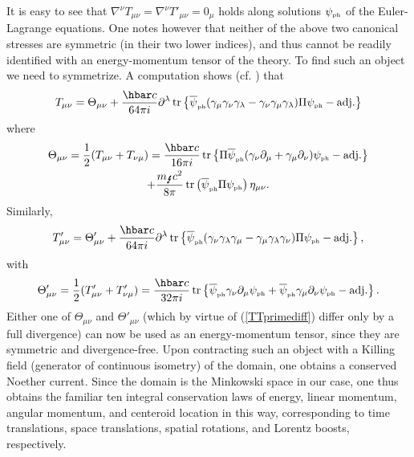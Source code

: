 \documentclass[12pt]{article}
\theoremstyle{definition}
\DeclareMathOperator{\tr}{tr}
\newcommand{\refeq}[1]{(\ref{#1})}
\numberwithin{equation}{section}
\newcommand{\beq}{\begin{equation}}
\newcommand{\eeq}{\end{equation}}
\newcommand{\p}{\partial}
\newcommand{\psiPH}{{\psi_{\mbox{\rm\tiny ph}}}}
\newcommand{\psiPHb}{{\overline\psi_{\mbox{\rm\tiny ph}}}}
\newcommand{\mPH}{{m_{\mbox{\Lightning}}}}
\newcommand{\la}{\lambda}
\newcommand{\ga}{\gamma}
\newcommand{\nab}{\nabla}
\newcommand{\half}{\frac{1}{2}}
\begin{document}
It is easy to see that $\nab^\nu T_{\mu\nu} = \nab^\nu T'_{\mu\nu} = 0_\mu$ holds along solutions $\psiPH$ of the Euler-Lagrange equations.
  One notes however that neither of the above two canonical stresses are symmetric (in their two lower indices), and thus cannot be readily 
identified with an energy-momentum tensor of the theory. 
 To find such an object we need to symmetrize. 
 A computation shows (cf. \cite{HC1946}) that
\begin{multline} 
T_{\mu\nu} = 
\Theta_{\mu\nu}+\frac{\hbar c}{64 \pi i} \p^\la \tr \left\{ \psiPHb (\ga_\mu\ga_\nu\ga_\la - \ga_\nu\ga_\mu\ga_\la) \Pi\psiPH - \mbox{adj.} \right\}
\end{multline} 
where
\begin{multline} 
\Theta_{\mu\nu} = \half (T_{\mu\nu} + T_{\nu\mu}) =
\frac{\hbar c}{16 \pi i} \tr\left\{ \Pi\psiPHb (\ga_\nu \p_\mu + \ga_\mu\p_\nu)\psiPH - \mbox{adj.} \right\} \\
+\frac{\mPH c^2}{8 \pi} \tr \left(\psiPHb \Pi\psiPH\right)\eta_{\mu\nu}.
\end{multline} 
Similarly,
\beq 
T'_{\mu\nu} = 
\Theta'_{\mu\nu}+\frac{\hbar c}{64 \pi i} \p^\la \tr\left\{ \psiPHb (\ga_\nu\ga_\la \ga_\mu - \ga_\mu \ga_\la \ga_\nu ) 
\Pi \psiPH - \mbox{adj.} \right\},
\eeq
with 
\beq 
\Theta'_{\mu\nu} = \half( T'_{\mu\nu} + T'_{\nu\mu}) 
= \frac{\hbar c}{32 \pi i} \tr \left\{ \psiPHb \ga_\nu \p_\mu \psiPH + \psiPHb \ga_\mu \p_\nu \psiPH - \mbox{adj.} \right\}.
\eeq
Either one of $\Theta_{\mu\nu}$ and $\Theta'_{\mu\nu}$ (which by virtue of \refeq{TTprimediff} differ only by a full divergence) can 
now be used as an energy-momentum tensor, since they are symmetric and divergence-free. 
 Upon contracting such an object with a Killing field (generator of continuous isometry) of the domain, one obtains a conserved Noether current.
  Since the domain is the Minkowski space in our case, one thus obtains the familiar ten integral conservation laws of energy, linear momentum, 
angular momentum, and centeroid location in this way, corresponding to time translations, space translations, spatial rotations, and Lorentz 
boosts, respectively.  
\end{document}

